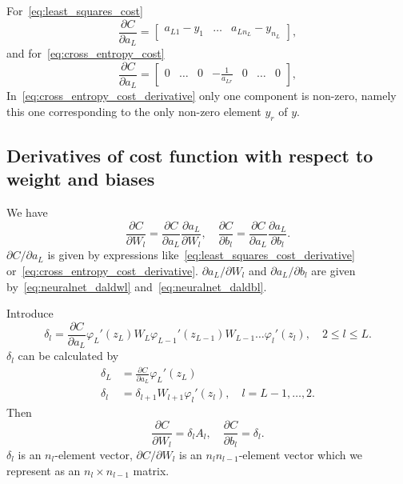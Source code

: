 For~\eqref{eq:least_squares_cost}
\begin{equation} \label{eq:least_squares_cost_derivative}
  \frac{\partial C}{\partial a_{L}} =
  \begin{bmatrix}
    a_{L1} - y_1 & \dots & a_{Ln_L} - y_{n_L}
  \end{bmatrix},
\end{equation}
and for~\eqref{eq:cross_entropy_cost}
\begin{equation} \label{eq:cross_entropy_cost_derivative}
  \frac{\partial C}{\partial a_{L}} =
  \begin{bmatrix}
    0 & \dots & 0 & -\frac{1}{a_{Lr}} & 0 & \dots & 0
  \end{bmatrix},
\end{equation}
In~\eqref{eq:cross_entropy_cost_derivative} only one component is
non-zero, namely this one corresponding to the only non-zero element
$y_r$ of $y$.

\subsection{Derivatives of cost function with respect to weight and
  biases}

We have
\begin{equation*}
  \frac{\partial C}{\partial W_l} = \frac{\partial C}{\partial a_L}
  \frac{\partial a_L}{\partial W_l}, \quad
  \frac{\partial C}{\partial b_l} = \frac{\partial C}{\partial a_L}
  \frac{\partial a_L}{\partial b_l}.
\end{equation*}
$\partial C / \partial a_L$ is given by expressions
like~\eqref{eq:least_squares_cost_derivative}
or~\eqref{eq:cross_entropy_cost_derivative}. $\partial a_L / \partial
W_l$ and $\partial a_L / \partial b_l$ are given
by~\eqref{eq:neuralnet_daldwl} and~\eqref{eq:neuralnet_daldbl}.

Introduce
\begin{equation*}
  \delta_l = \frac{\partial C}{\partial a_L}
  \varphi_{L}'(z_{L})W_{L}\varphi_{L - 1}'(z_{L - 1})W_{L - 1} \ldots
  \varphi_{l}'(z_{l}), \quad 2 \leq l \leq L.
\end{equation*}
$\delta_l$ can be calculated by
\begin{align*}
  \delta_L &= \frac{\partial C}{\partial a_L} \varphi_{L}'(z_{L})
  \\ \delta_l &= \delta_{l + 1} W_{l + 1} \varphi_{l}'(z_{l}), \quad l
  = L - 1, \ldots, 2.
\end{align*}
Then
\begin{equation*}
  \frac{\partial C}{\partial W_l} = \delta_l A_l, \quad
  \frac{\partial C}{\partial b_l} = \delta_l.
\end{equation*}
$\delta_l$ is an $n_l$-element vector, $\partial C / \partial W_l$ is
an $n_ln_{l - 1}$-element vector which we represent as an $n_l \times
n_{l - 1}$ matrix.

